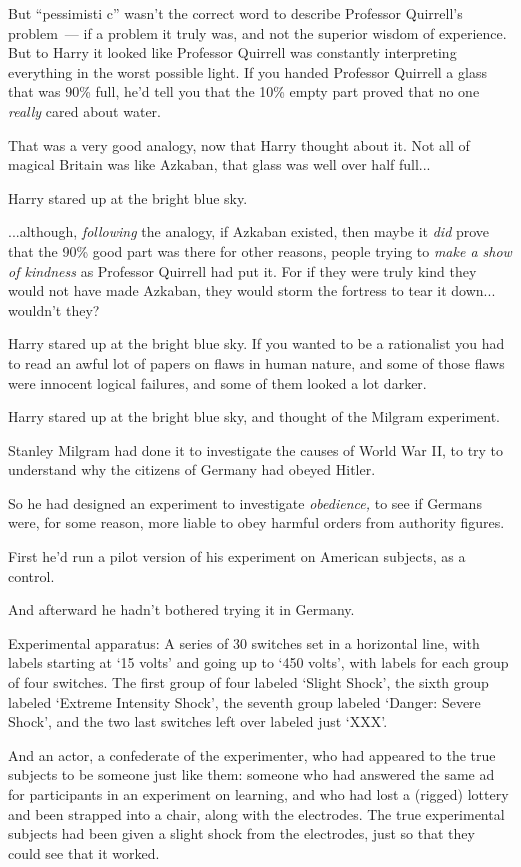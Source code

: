 But ``pessimisti c'' wasn't the correct word to describe Professor Quirrell's problem~--- if a problem it truly was, and not the superior wisdom of experience. But to Harry it looked like Professor Quirrell was constantly interpreting everything in the worst possible light. If you handed Professor Quirrell a glass that was 90\% full, he'd tell you that the 10\% empty part proved that no one \emph{really} cared about water.

That was a very good analogy, now that Harry thought about it. Not all of magical Britain was like Azkaban, that glass was well over half full...

Harry stared up at the bright blue sky.

...although, \emph{following} the analogy, if Azkaban existed, then maybe it \emph{did} prove that the 90\% good part was there for other reasons, people trying to \emph{make a show of kindness} as Professor Quirrell had put it. For if they were truly kind they would not have made Azkaban, they would storm the fortress to tear it down... wouldn't they?

Harry stared up at the bright blue sky. If you wanted to be a rationalist you had to read an awful lot of papers on flaws in human nature, and some of those flaws were innocent logical failures, and some of them looked a lot darker.

Harry stared up at the bright blue sky, and thought of the Milgram experiment.

Stanley Milgram had done it to investigate the causes of World War II, to try to understand why the citizens of Germany had obeyed Hitler.

So he had designed an experiment to investigate \emph{obedience,} to see if Germans were, for some reason, more liable to obey harmful orders from authority figures.

First he'd run a pilot version of his experiment on American subjects, as a control.

And afterward he hadn't bothered trying it in Germany.

Experimental apparatus: A series of 30 switches set in a horizontal line, with labels starting at `15 volts' and going up to `450 volts', with labels for each group of four switches. The first group of four labeled `Slight Shock', the sixth group labeled `Extreme Intensity Shock', the seventh group labeled `Danger: Severe Shock', and the two last switches left over labeled just `XXX'.

And an actor, a confederate of the experimenter, who had appeared to the true subjects to be someone just like them: someone who had answered the same ad for participants in an experiment on learning, and who had lost a (rigged) lottery and been strapped into a chair, along with the electrodes. The true experimental subjects had been given a slight shock from the electrodes, just so that they could see that it worked.

